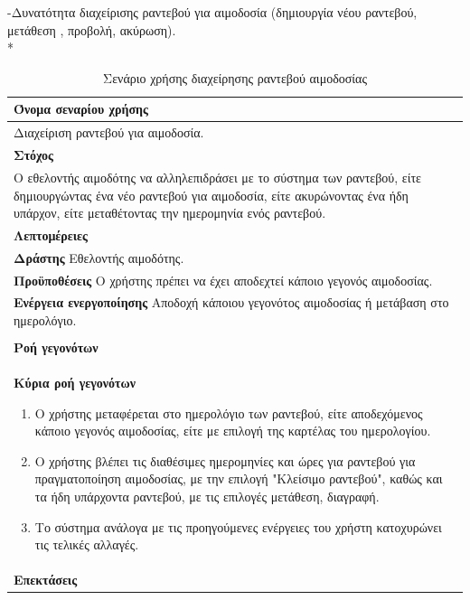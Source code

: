 			
-Δυνατότητα διαχείρισης ραντεβού για αιμοδοσία (δημιουργία νέου ραντεβού, μετάθεση , προβολή, ακύρωση).
\\*
\begin{table}[H]
	\begin{center}
	    \begin{tabular}{|p{\dimexpr \linewidth-2\tabcolsep}|}
	    \hline
	    \rowcolor{grayy}
	    \textbf{Όνομα σεναρίου χρήσης}
	    \\ \hline    
	     Διαχείριση ραντεβού για αιμοδοσία.
	     \\ \hline
	    \rowcolor{grayy}
	    \textbf{\textbf{Στόχος}}
	    \\ \hline
	 	 Ο εθελοντής αιμοδότης να αλληλεπιδράσει με το σύστημα των ραντεβού, είτε δημιουργώντας ένα νέο ραντεβού για αιμοδοσία, είτε ακυρώνοντας ένα ήδη υπάρχον, είτε μεταθέτοντας την ημερομηνία ενός ραντεβού.
	    \\ \hline
	    \rowcolor{grayy}
	    \textbf{Λεπτομέρειες}
	    \\ \hline
		\textbf{Δράστης} Εθελοντής αιμοδότης.
		\\*
		\textbf{Προϋποθέσεις} Ο χρήστης πρέπει να έχει αποδεχτεί κάποιο γεγονός αιμοδοσίας.
		\\*
		\textbf{Ενέργεια ενεργοποίησης} Αποδοχή κάποιου γεγονότος αιμοδοσίας ή μετάβαση στο ημερολόγιο.
		\\ \hline
	    \\ \hline
		\rowcolor{grayy}    
	    \textbf{Ροή γεγονότων}
	    \\* 
		\textbf{Κύρια ροή γεγονότων}
		\begin{enumerate}
			\item	 Ο χρήστης μεταφέρεται στο ημερολόγιο των ραντεβού, είτε αποδεχόμενος κάποιο γεγονός αιμοδοσίας, είτε με επιλογή της καρτέλας του ημερολογίου.
			\item  Ο χρήστης βλέπει τις διαθέσιμες ημερομηνίες και ώρες για ραντεβού για πραγματοποίηση αιμοδοσίας, με την επιλογή "Κλείσιμο ραντεβού", καθώς και τα ήδη υπάρχοντα ραντεβού, με τις επιλογές μετάθεση, διαγραφή.
			\item Το σύστημα ανάλογα με τις προηγούμενες ενέργειες του χρήστη κατοχυρώνει τις τελικές αλλαγές.
		\end{enumerate}
		\\*
		\textbf{Επεκτάσεις}
		   \\ \hline
	    \end{tabular}
	    \caption{Σενάριο χρήσης διαχείρησης ραντεβού αιμοδοσίας}
	    \label{tab:blood_donation_reservation_management} 
	\end{center}
\end{table}	
			
